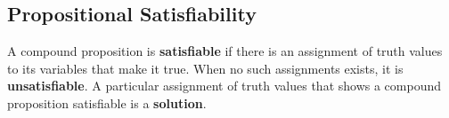 \begin{defn}
%

\section{Propositional Satisfiability}

A compound proposition is \textbf{satisfiable} if there is an assignment of truth values to its variables that make it true.
When no such assignments exists, it is \textbf{unsatisfiable}.
A particular assignment of truth values that shows a compound proposition satisfiable is a \textbf{solution}.


\end{defn}
